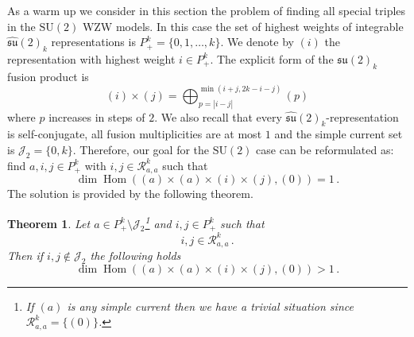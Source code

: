 \documentclass[a4paper,11pt]{article}
\theoremstyle{plain}
\newtheorem{thm}{Theorem}[section]
\theoremstyle{definition}
\begin{document}
As a warm up  we consider in this section the  problem of finding all special triples  in the $\mathrm{SU(2)}$ WZW models. In this case the set of highest weights of  integrable $\widehat{\mathfrak{su}}(2)_k$ representations is $P_+^k=\{0,1,\ldots,k\}$. We  denote by $(i)$ the representation with highest weight $i\in P_+^k$. The explicit form of the  $\widehat{\mathfrak{su}}(2)_k$ fusion product is
 \begin{equation}\label{su2fus}
        (i)\times(j)=\bigoplus_{p=|i-j|}^{\operatorname{min}(i+j,2k-i-j)}(p)
    \end{equation}
 where $p$ increases in steps of $2$. We also recall that every $\widehat{\mathfrak{su}}(2)_k$-representation is self-conjugate, all fusion multiplicities are at most $1$ and the simple current set is $\mathcal{J}_2=\{0,k\}$.  Therefore, our goal for the $\mathrm{SU(2)}$ case can be reformulated as: find $a,i,j\in P_+^k$ with $i,j\in \mathcal{R}^k_{a,a}$ such that
 \begin{equation}\label{propertysu2}
      \operatorname{dim}\operatorname{Hom}\left((a)\times(a)\times(i)\times(j),(0)\right)=1\,.
 \end{equation}
The solution is provided by the following theorem.
\begin{thm}\label{su2thm}
   Let $a\in P_+^k\setminus \mathcal{J}_2$\footnote{If $(a)$ is any simple current then we have a trivial situation since $\mathcal{R}^k_{a,a}=\{(0)\}$.} and  $i,j\in P_+^k$ such that 
    \begin{equation}\label{con}
    i,j\in \mathcal{R}^k_{a,a}\,.
    \end{equation}
    Then if $i,j\notin \mathcal{J}_2$ the following holds
   \begin{equation}
       \operatorname{dim}\operatorname{Hom}\left((a)\times(a)\times(i)\times(j),(0)\right) >1 \,.
   \end{equation}
\end{thm}
\end{document}
